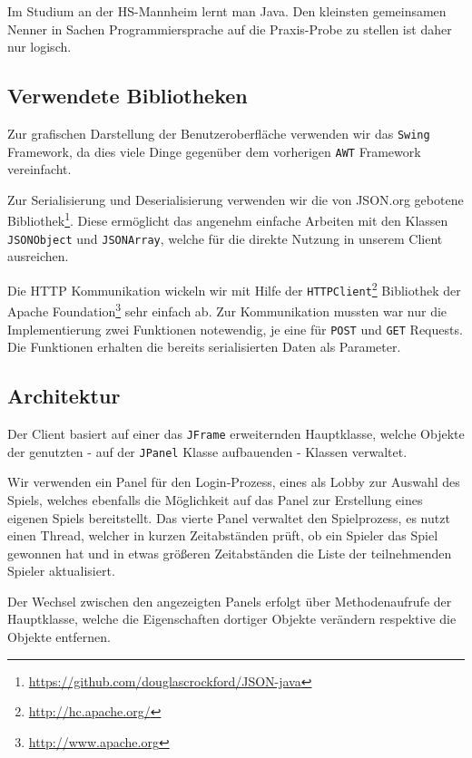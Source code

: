 \documentclass[12pt, a4paper]{scrartcl}
\begin{document}
Im Studium an der HS-Mannheim lernt man Java. Den kleinsten gemeinsamen Nenner
in Sachen Programmiersprache auf die Praxis-Probe zu stellen ist daher nur
logisch.
\np

\subsection{Verwendete Bibliotheken}
Zur grafischen Darstellung der Benutzeroberfläche verwenden wir das
\texttt{Swing} Framework, da dies viele Dinge gegenüber dem vorherigen 
\texttt{AWT} Framework vereinfacht.
\np

Zur Serialisierung und Deserialisierung verwenden wir die von JSON.org gebotene
Bibliothek\footnote{\url{https://github.com/douglascrockford/JSON-java}}. Diese
ermöglicht das angenehm einfache Arbeiten mit den Klassen \texttt{JSONObject}
und \texttt{JSONArray}, welche für die direkte Nutzung in unserem Client ausreichen.
\np

Die HTTP Kommunikation wickeln wir mit Hilfe der \texttt{HTTPClient}\footnote{
\url{http://hc.apache.org/}} Bibliothek der Apache Foundation\footnote{
\url{http://www.apache.org}} sehr einfach ab. Zur Kommunikation mussten war nur
die Implementierung zwei Funktionen notewendig, je eine für \texttt{POST} und
\texttt{GET} Requests. Die Funktionen erhalten die bereits serialisierten Daten
als Parameter.
\np

\subsection{Architektur}
Der Client basiert auf einer das \texttt{JFrame} erweiternden Hauptklasse,
welche Objekte der genutzten - auf der \texttt{JPanel} Klasse aufbauenden
- Klassen verwaltet.
\np

Wir verwenden ein Panel für den Login-Prozess, eines als Lobby zur Auswahl
des Spiels, welches ebenfalls die Möglichkeit auf das Panel zur Erstellung
eines eigenen Spiels bereitstellt. Das vierte Panel verwaltet den Spielprozess,
es nutzt einen Thread, welcher in kurzen Zeitabständen prüft, ob ein Spieler
das Spiel gewonnen hat und in etwas größeren Zeitabständen die Liste der
teilnehmenden Spieler aktualisiert.
\np

Der Wechsel zwischen den angezeigten Panels erfolgt über Methodenaufrufe der
Hauptklasse, welche die Eigenschaften dortiger Objekte verändern respektive
die Objekte entfernen.


\clearpage
\end{document}
